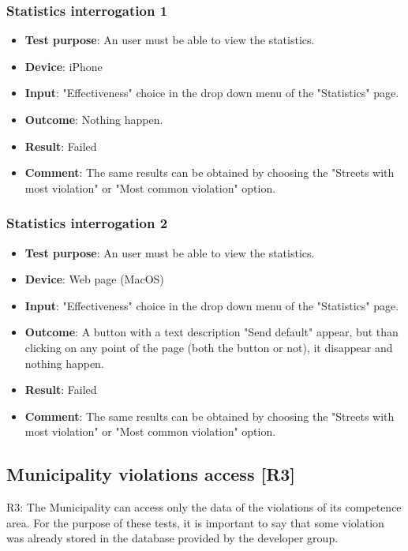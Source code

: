 \documentclass[../ATD.tex]{subfiles}
\begin{document}
    \subsubsection{Statistics interrogation 1}\label{subsubsec:statistics-interrogation-1}
    \begin{itemize}
        \item \textbf{Test purpose}: An user must be able to view the statistics.
        \item \textbf{Device}: iPhone
        \item \textbf{Input}: "Effectiveness" choice in the drop down menu of the "Statistics" page.
        \item \textbf{Outcome}: Nothing happen.
        \item \textbf{Result}: Failed
        \item \textbf{Comment}: The same results can be obtained by choosing the "Streets with most violation" or "Most common violation" option.
    \end{itemize}

    \subsubsection{Statistics interrogation 2}\label{subsec:statistics-interrogation-2}
    \begin{itemize}
        \item \textbf{Test purpose}: An user must be able to view the statistics.
        \item \textbf{Device}: Web page (MacOS)
        \item \textbf{Input}: "Effectiveness" choice in the drop down menu of the "Statistics" page.
        \item \textbf{Outcome}: A button with a text description "Send default" appear, but than clicking on any point of the page (both the button or not), it disappear and nothing happen.
        \item \textbf{Result}: Failed
        \item \textbf{Comment}: The same results can be obtained by choosing the "Streets with most violation" or "Most common violation" option.
    \end{itemize}

    \subsection{Municipality violations access [R3]}\label{subsec:municipality-report-access}
    R3: The Municipality can access only the data of the violations of its competence area.
    \newline
    For the purpose of these tests, it is important to say that some violation was already stored in the database provided by the developer group.
\end{document}
